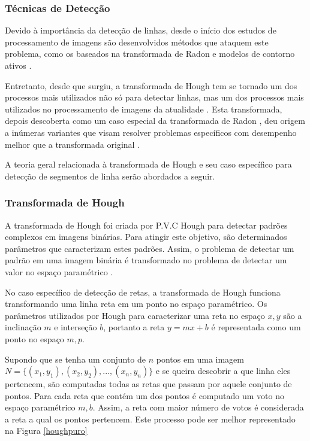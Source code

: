 \subsubsection{Técnicas de Detecção}

Devido à importância da detecção de linhas, desde o início dos estudos de processamento de imagens são desenvolvidos métodos que ataquem este problema, como os baseados na transformada de Radon \cite{linhanavio,radon00} e modelos de contorno ativos \cite{contorno00,contorno01}.

Entretanto, desde que surgiu, a transformada de Hough tem se tornado um dos processos mais utilizados não só para detectar linhas, mas um dos processos mais utilizados no processamento de imagens da atualidade \cite{houghhistory}. Esta transformada, depois descoberta como um caso especial da transformada de Radon \cite{houghradon}, deu origem a inúmeras variantes que visam resolver problemas específicos com desempenho melhor que a transformada original \cite{houghalt00,houghalt01,houghalt02,houghalt03}.

A teoria geral relacionada à transformada de Hough e seu caso específico para detecção de segmentos de linha serão abordados a seguir.

\subsubsection{Transformada de Hough}

A transformada de Hough foi criada por P.V.C Hough para detectar padrões complexos em imagens binárias. Para atingir este objetivo, são determinados parâmetros que caracterizam estes padrões. Assim, o problema de detectar um padrão em uma imagem binária é transformado no problema de detectar um valor no espaço paramétrico \cite{houghintro01}.


No caso específico de detecção de retas, a transformada de Hough funciona transformando uma linha reta em um ponto no espaço paramétrico. Os parâmetros utilizados por Hough para caracterizar uma reta no espaço $x,y$ são a inclinação $m$ e interseção $b$, portanto a reta $y = mx+b$ é representada como um ponto no espaço $m,p$.

Supondo que se tenha um conjunto de $n$ pontos em uma imagem $N = \{(x_1,y_1),(x_2,y_2),...,(x_n,y_n)\}$  e se queira descobrir a que linha eles pertencem, são computadas todas as retas que passam por aquele conjunto de pontos. Para cada reta que contém um dos pontos é computado um voto no espaço paramétrico $m,b$. Assim, a reta com maior número de votos é considerada a reta a qual os pontos pertencem. Este processo pode ser melhor representado na Figura \ref{houghpuro}

